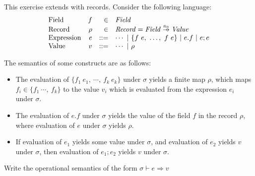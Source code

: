 \begin{exercise}

This exercise extends \lang with records.
  Consider the following language:
\[
\begin{array}{lrrl}
  \text{Field} & f & \in & \textit{Field} \\
  \text{Record} & \rho & \in & \embox{Record} = \embox{Field} \finto \embox{Value} \\
  \text{Expression}& e & ::= & \cdots\ |\ \{f\ e,\ \ldots,\ f\ e\}\ |\ e.f\ |\
  e;e \\
  \text{Value} & v & ::= & \cdots\ |\ \rho \\
\end{array}
\]

The semantics of some constructs are as follows:
\begin{itemize}
  \item The evaluation of $\{f_1\ e_1,\ \cdots,\ f_k\ e_k\}$
    under $\sigma$ yields a finite map $\rho$,
which maps $f_i \in \{f_1\ \cdots,\ f_k\}$
to the value $v_i$ which is evaluated from the expression $e_i$ under $\sigma$.
  \item The evaluation of $e.f$ under $\sigma$ yields the value of the field $f$ in the record $\rho$,
      where evaluation of $e$ under $\sigma$ yields $\rho$.
  \item If evaluation of $e_1$ yields some value under $\sigma$, and evaluation
    of $e_2$ yields $v$ under $\sigma$,
      then evaluation of $e_1; e_2$ yields $v$ under $\sigma$.
\end{itemize}

Write the operational semantics of the form
$\boxed{\sigma \vdash e \Rightarrow v}$

\end{exercise}

